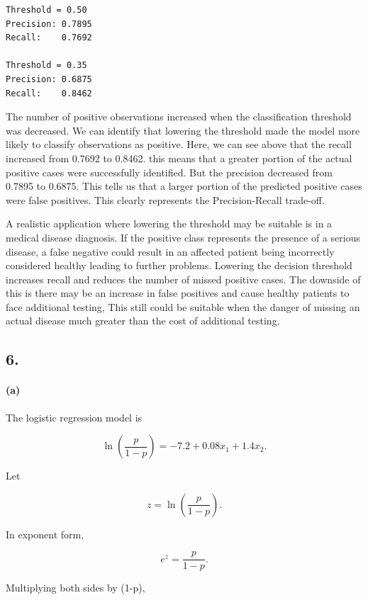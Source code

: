 \documentclass[11pt]{article}
\begin{document}
    \begin{Verbatim}[commandchars=\\\{\}]
Threshold = 0.50
Precision: 0.7895
Recall:    0.7692

Threshold = 0.35
Precision: 0.6875
Recall:    0.8462
    \end{Verbatim}

    The number of positive observations increased when the classification
threshold was decreased. We can identify that lowering the threshold
made the model more likely to classify observations as positive. Here,
we can see above that the recall increased from 0.7692 to 0.8462. this
means that a greater portion of the actual positive cases were
successfully identified. But the precision decreased from 0.7895 to
0.6875. This tells us that a larger portion of the predicted positive
cases were false positives. This clearly represents the Precision-Recall
trade-off.

A realistic application where lowering the threshold may be suitable is
in a medical disease diagnosis. If the positive class represents the
presence of a serious disease, a false negative could result in an
affected patient being incorrectly considered healthy leading to further
problems. Lowering the decision threshold increases recall and reduces
the number of missed positive cases. The downside of this is there may
be an increase in false positives and cause healthy patients to face
additional testing, This still could be suitable when the danger of
missing an actual disease much greater than the cost of additional
testing.

    \subsection{6.}

\paragraph{(a)}\label{a}

The logistic regression model is

\[
\ln\left(\frac{p}{1-p}\right)
=
-7.2+0.08x_1+1.4x_2.
\]

Let

\[
z=\ln\left(\frac{p}{1-p}\right).
\]

In exponent form,

\[
e^z=\frac{p}{1-p}.
\]

Multiplying both sides by (1-p),
\end{document}
